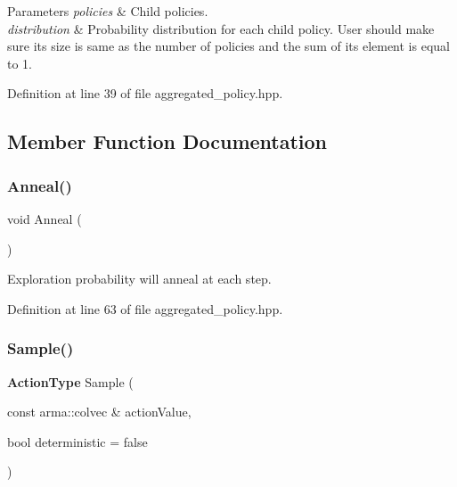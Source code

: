 \begin{DoxyParams}{Parameters}
{\em policies} & Child policies. \\
\hline
{\em distribution} & Probability distribution for each child policy. User should make sure its size is same as the number of policies and the sum of its element is equal to 1. \\
\hline
\end{DoxyParams}


Definition at line 39 of file aggregated\+\_\+policy.\+hpp.



\subsection{Member Function Documentation}
\mbox{\label{classmlpack_1_1rl_1_1AggregatedPolicy_a280278726ff7d32f2b7eff5c92a1767a}} 
\subsubsection{Anneal()}
{\footnotesize\ttfamily void Anneal (\begin{DoxyParamCaption}{ }\end{DoxyParamCaption})\hspace{0.3cm}{\ttfamily [inline]}}



Exploration probability will anneal at each step. 



Definition at line 63 of file aggregated\+\_\+policy.\+hpp.

\mbox{\label{classmlpack_1_1rl_1_1AggregatedPolicy_a631fe506e7d81fba96697ba11c6ace84}} 
\subsubsection{Sample()}
{\footnotesize\ttfamily \textbf{ Action\+Type} Sample (\begin{DoxyParamCaption}\item[{const arma\+::colvec \&}]{action\+Value,  }\item[{bool}]{deterministic = {\ttfamily false} }\end{DoxyParamCaption})\hspace{0.3cm}{\ttfamily [inline]}}



